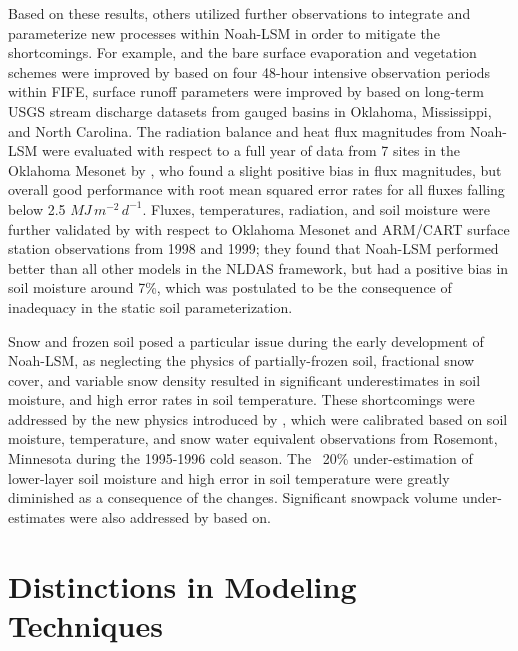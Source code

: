 Based on these results, others utilized further observations to integrate and parameterize new processes within Noah-LSM in order to mitigate the shortcomings. For example, and the bare surface evaporation and vegetation schemes were improved by \citep{betts_assessment_1997} based on four 48-hour intensive observation periods within FIFE, surface runoff parameters were improved by \citep{schaake_simple_1996} based on long-term USGS stream discharge datasets from gauged basins in Oklahoma, Mississippi, and North Carolina. The radiation balance and heat flux magnitudes from Noah-LSM were evaluated with respect to a full year of data from 7 sites in the Oklahoma Mesonet by \citep{sridhar_validation_2002}, who found a slight positive bias in flux magnitudes, but overall good performance with root mean squared error rates for all fluxes falling below 2.5 $MJ\,m^{-2}\,d^{-1}$. Fluxes, temperatures, radiation, and soil moisture were further validated by \citep{robock_evaluation_2003} with respect to Oklahoma Mesonet and ARM/CART surface station observations from 1998 and 1999; they found that Noah-LSM performed better than all other models in the NLDAS framework, but had a positive bias in soil moisture around 7\%, which was postulated to be the consequence of inadequacy in the static soil parameterization.

Snow and frozen soil posed a particular issue during the early development of Noah-LSM, as neglecting the physics of partially-frozen soil, fractional snow cover, and variable snow density resulted in significant underestimates in soil moisture, and high error rates in soil temperature. These shortcomings were addressed by the new physics introduced by \citep{koren_parameterization_1999}, which were calibrated based on soil moisture, temperature, and snow water equivalent observations from Rosemont, Minnesota during the 1995-1996 cold season. The ~20\% under-estimation of lower-layer soil moisture and high error in soil temperature were greatly diminished as a consequence of the changes. Significant snowpack volume under-estimates were also addressed by \citep{barlage_noah_2010} based on.

\section{Distinctions in Modeling Techniques}

